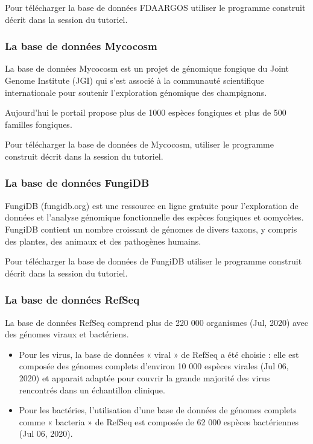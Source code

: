 \documentclass[letterpaper,10pt,french]{sphinxmanual}
\begin{document}
Pour télécharger la base de données FDA\sphinxhyphen{}ARGOS utiliser le programme construit décrit dans la session {\hyperref[\detokenize{tutorial:download-fda-argos}]{}} du tutoriel.


\subsubsection{La base de données Mycocosm}
\label{\detokenize{overview:la-base-de-donnees-mycocosm}}
La base de données Mycocosm est un projet de génomique fongique du Joint Genome Institute (JGI) qui s’est associé à la communauté scientifique internationale pour soutenir l’exploration génomique des champignons.

Aujourd’hui le portail propose plus de 1000 espèces fongiques et plus de 500 familles fongiques.

Pour télécharger la base de données de Mycocosm, utiliser le programme construit décrit dans la session {\hyperref[\detokenize{tutorial:download-mycocosm}]{}} du tutoriel.


\subsubsection{La base de données FungiDB}
\label{\detokenize{overview:la-base-de-donnees-fungidb}}
FungiDB (fungidb.org) est une ressource en ligne gratuite pour l’exploration de données et l’analyse génomique fonctionnelle des espèces fongiques et oomycètes. FungiDB contient un nombre croissant de génomes de divers taxons, y compris des plantes, des animaux et des pathogènes humains.

Pour télécharger la base de données de FungiDB utiliser le programme construit décrit dans la session {\hyperref[\detokenize{tutorial:download-fungidb}]{}} du tutoriel.


\subsubsection{La base de données RefSeq}
\label{\detokenize{overview:la-base-de-donnees-refseq}}
La base de données RefSeq comprend plus de 220 000 organismes (Jul, 2020) avec des génomes viraux et bactériens.
\begin{itemize}
\item {} 
Pour les virus, la base de données « viral » de RefSeq a été choisie : elle est composée des génomes complets d’environ 10 000 espèces virales (Jul 06, 2020) et apparait adaptée pour couvrir la grande majorité des virus rencontrés dans un échantillon clinique.

\item {} 
Pour les bactéries, l’utilisation d’une base de données de génomes complets comme « bacteria » de RefSeq est composée de 62 000 espèces bactériennes (Jul 06, 2020).

\end{itemize}
\end{document}

